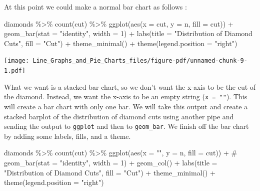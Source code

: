 \documentclass[
  letterpaper,
  DIV=11,
  numbers=noendperiod]{scrreprt}
\newenvironment{Shaded}{\begin{snugshade}}{\end{snugshade}}
\newcommand{\AttributeTok}[1]{\textcolor[rgb]{0.40,0.45,0.13}{#1}}
\newcommand{\CommentTok}[1]{\textcolor[rgb]{0.37,0.37,0.37}{#1}}
\newcommand{\DecValTok}[1]{\textcolor[rgb]{0.68,0.00,0.00}{#1}}
\newcommand{\FunctionTok}[1]{\textcolor[rgb]{0.28,0.35,0.67}{#1}}
\newcommand{\NormalTok}[1]{\textcolor[rgb]{0.00,0.23,0.31}{#1}}
\newcommand{\SpecialCharTok}[1]{\textcolor[rgb]{0.37,0.37,0.37}{#1}}
\newcommand{\StringTok}[1]{\textcolor[rgb]{0.13,0.47,0.30}{#1}}
\begin{document}
At this point we could make a normal bar chart as follows :

\begin{Shaded}
\begin{Highlighting}[]
\NormalTok{diamonds }\SpecialCharTok{\%\textgreater{}\%}
  \FunctionTok{count}\NormalTok{(cut) }\SpecialCharTok{\%\textgreater{}\%}
  \FunctionTok{ggplot}\NormalTok{(}\FunctionTok{aes}\NormalTok{(}\AttributeTok{x =}\NormalTok{ cut, }\AttributeTok{y =}\NormalTok{ n, }\AttributeTok{fill =}\NormalTok{ cut)) }\SpecialCharTok{+}
  \FunctionTok{geom\_bar}\NormalTok{(}\AttributeTok{stat =} \StringTok{"identity"}\NormalTok{, }\AttributeTok{width =} \DecValTok{1}\NormalTok{) }\SpecialCharTok{+}
  \FunctionTok{labs}\NormalTok{(}\AttributeTok{title =} \StringTok{"Distribution of Diamond Cuts"}\NormalTok{,}
       \AttributeTok{fill =} \StringTok{"Cut"}\NormalTok{) }\SpecialCharTok{+}
  \FunctionTok{theme\_minimal}\NormalTok{() }\SpecialCharTok{+}
  \FunctionTok{theme}\NormalTok{(}\AttributeTok{legend.position =} \StringTok{"right"}\NormalTok{)}
\end{Highlighting}
\end{Shaded}

\texttt{[image: Line\_Graphs\_and\_Pie\_Charts\_files/figure-pdf/unnamed-chunk-9-1.pdf]}

What we want is a stacked bar chart, so we don't want the x-axis to be
the cut of the diamond. Instead, we want the x-axis to be an empty
string (\texttt{x\ =\ ""}). This will create a bar chart with only one
bar. We will take this output and create a stacked barplot of the
distribution of diamond cuts using another pipe and sending the output
to \texttt{ggplot} and then to \texttt{geom\_bar}. We finish off the bar
chart by adding some labels, fills, and a theme.

\begin{Shaded}
\begin{Highlighting}[]
\NormalTok{diamonds }\SpecialCharTok{\%\textgreater{}\%}
  \FunctionTok{count}\NormalTok{(cut) }\SpecialCharTok{\%\textgreater{}\%}
  \FunctionTok{ggplot}\NormalTok{(}\FunctionTok{aes}\NormalTok{(}\AttributeTok{x =} \StringTok{""}\NormalTok{, }\AttributeTok{y =}\NormalTok{ n, }\AttributeTok{fill =}\NormalTok{ cut)) }\SpecialCharTok{+}
\CommentTok{\#  geom\_bar(stat = "identity", width = 1) +}
  \FunctionTok{geom\_col}\NormalTok{() }\SpecialCharTok{+}
    \FunctionTok{labs}\NormalTok{(}\AttributeTok{title =} \StringTok{"Distribution of Diamond Cuts"}\NormalTok{,}
       \AttributeTok{fill =} \StringTok{"Cut"}\NormalTok{) }\SpecialCharTok{+}
  \FunctionTok{theme\_minimal}\NormalTok{() }\SpecialCharTok{+}
  \FunctionTok{theme}\NormalTok{(}\AttributeTok{legend.position =} \StringTok{"right"}\NormalTok{)}
\end{Highlighting}
\end{Shaded}
\end{document}
